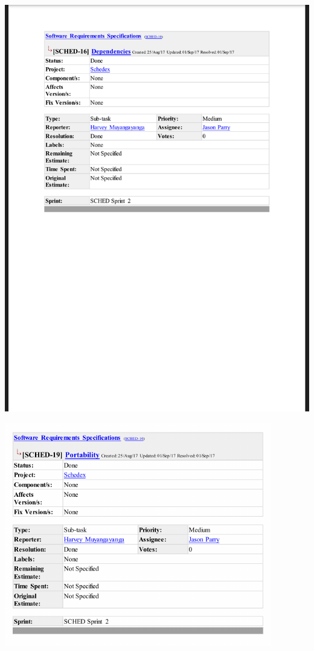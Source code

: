 \documentclass{article}
\begin{document}
\centerline{\includegraphics[scale=0.4]{sprint2_6}}

\centerline{\includegraphics[scale=1]{sprint2_7}}
\end{document}
